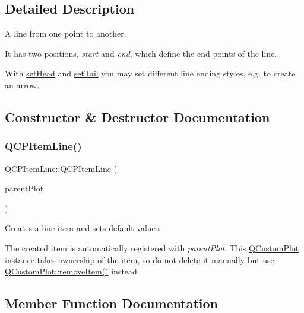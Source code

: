 \subsection{Detailed Description}
A line from one point to another. 

 It has two positions, {\itshape start} and {\itshape end}, which define the end points of the line.

With \hyperlink{classQCPItemLine_aebf3d687114d584e0459db6759e2c3c3}{set\+Head} and \hyperlink{classQCPItemLine_ac264222c3297a7efe33df9345c811a5f}{set\+Tail} you may set different line ending styles, e.\+g. to create an arrow. 

\subsection{Constructor \& Destructor Documentation}
\mbox{\label{classQCPItemLine_a17804b7f64961c6accf25b61e85142e3}} 
\subsubsection{\texorpdfstring{Q\+C\+P\+Item\+Line()}{QCPItemLine()}}
{\footnotesize\ttfamily Q\+C\+P\+Item\+Line\+::\+Q\+C\+P\+Item\+Line (\begin{DoxyParamCaption}\item[{\hyperlink{classQCustomPlot}{Q\+Custom\+Plot} $\ast$}]{parent\+Plot }\end{DoxyParamCaption})\hspace{0.3cm}{\ttfamily [explicit]}}

Creates a line item and sets default values.

The created item is automatically registered with {\itshape parent\+Plot}. This \hyperlink{classQCustomPlot}{Q\+Custom\+Plot} instance takes ownership of the item, so do not delete it manually but use \hyperlink{classQCustomPlot_ae04446557292551e8fb6e2c106e1848d}{Q\+Custom\+Plot\+::remove\+Item()} instead. 

\subsection{Member Function Documentation}
\mbox{\label{classQCPItemLine_a8e02bfbca04fbcf3dbc375a2bf693229}} 
